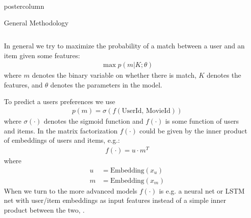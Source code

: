 \documentclass[final,hyperref={pdfpagelabels=false}]{beamer}
\begin{document}
\begin{frame}
\begin{columns}
\begin{column}{.49\paperwidth}
\begin{beamercolorbox}[center,wd=\textwidth]{postercolumn}
\begin{minipage}[T]{.99\textwidth}
{%

\begin{block}{General Methodology}
 \begin{columns}
 \begin{column}{1\textwidth}


\centering
\begin{minipage}[t]{0.98\textwidth}

\footnotesize{
In general we try to maximize the probability of a match between a user and an item given some features: 
%
\begin{align*}
\max p (m | K; \theta)
\end{align*}
%
where $m$ denotes the binary variable on whether there is match, $K$ denotes the features, and $\theta$ denotes the parameters in the model.

To predict a users preferences we use
%
%
\begin{align*}
    p(m) = \sigma( f ( \text{UserId, MovieId}) ) 
\end{align*}
%
where $\sigma( \cdot )$ denotes the sigmoid function and $f( \cdot )$ is some function of users and items. In the matrix factorization $f(\cdot)$ could be given by the inner product of embeddings of users and items, e.g.:
%
%
\begin{align*}
    f(\cdot) = u \cdot m^T
\end{align*}
%
%
where
%
%
\begin{align*}
    u &= \text{Embedding}(x_u) \\
    m &= \text{Embedding}(x_m) 
\end{align*}
%
%
When we turn to the more advanced models $f(\cdot)$ is e.g. a neural net or LSTM net with user/item embeddings as input features instead of a simple inner product between the two, \cite{paragraph_embedding_comparison, Embedding, doc2vec}.
\vspace{0.5cm}
}



\end{minipage} \hspace{1cm}


      
\end{column}
 \end{columns}
 \end{block}
 \vfill


}
\end{minipage}
\end{beamercolorbox}
\end{column}
\end{columns}
\end{frame}
\end{document}
